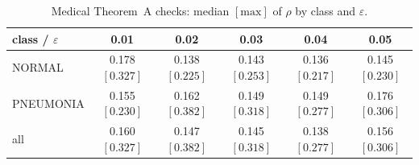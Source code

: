 \begin{table}[tbp]
\centering
\caption{Medical Theorem~A checks: median $[\mathrm{max}]$ of $\rho$ by class and $\varepsilon$.}
\label{tab:medical-rho}
\begin{tabular}{@{}lccccc@{}}
\toprule
class / $\varepsilon$ & 0.01 & 0.02 & 0.03 & 0.04 & 0.05 \\
\midrule
NORMAL & 0.178 $[0.327]$ & 0.138 $[0.225]$ & 0.143 $[0.253]$ & 0.136 $[0.217]$ & 0.145 $[0.230]$ \\
PNEUMONIA & 0.155 $[0.230]$ & 0.162 $[0.382]$ & 0.149 $[0.318]$ & 0.149 $[0.277]$ & 0.176 $[0.306]$ \\
\midrule
all & 0.160 $[0.327]$ & 0.147 $[0.382]$ & 0.145 $[0.318]$ & 0.138 $[0.277]$ & 0.156 $[0.306]$ \\
\bottomrule
\end{tabular}
\end{table}
